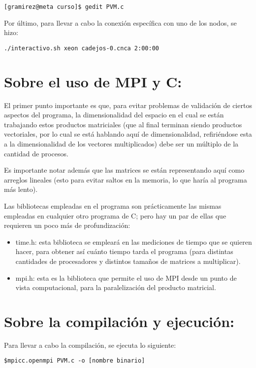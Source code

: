 \documentclass[letter]{article}
\begin{document}
\begin{lstlisting}
[gramirez@meta curso]$ gedit PVM.c
\end{lstlisting}

Por último, para llevar a cabo la conexión específica con uno de los nodos, se hizo:

\begin{lstlisting}
./interactivo.sh xeon cadejos-0.cnca 2:00:00
\end{lstlisting}


\section{\normalsize Sobre el uso de MPI y C:}
El primer punto importante es que, para evitar problemas de validación de ciertos aspectos del programa, la dimensionalidad del espacio en el cual se están trabajando estos productos matriciales (que al final terminan siendo productos vectoriales, por lo cual se está hablando aquí de dimensionalidad, refiriéndose esta a la dimensionalidad de los vectores multiplicados) debe ser un múltiplo de la cantidad de procesos.

Es importante notar además que las matrices se están representando aquí como arreglos lineales (esto para evitar saltos en la memoria, lo que haría al programa más lento).

Las bibliotecas empleadas en el programa son prácticamente las mismas empleadas en cualquier otro programa de C; pero hay un par de ellas que requieren un poco más de profundización:
\begin{itemize}
\item time.h: esta biblioteca se empleará en las mediciones de tiempo que se quieren hacer, para obtener así cuánto tiempo tarda el programa (para distintas cantidades de procesadores y distintos tamaños de matrices a multiplicar).
\item mpi.h: esta es la biblioteca que permite el uso de MPI desde un punto de vista computacional, para la paralelización del producto matricial.
\end{itemize}




\section{\normalsize Sobre la compilación y ejecución:}

Para llevar a cabo la compilación, se ejecuta lo siguiente:

\begin{lstlisting}
$mpicc.openmpi PVM.c -o [nombre binario]
\end{lstlisting}
\end{document}
